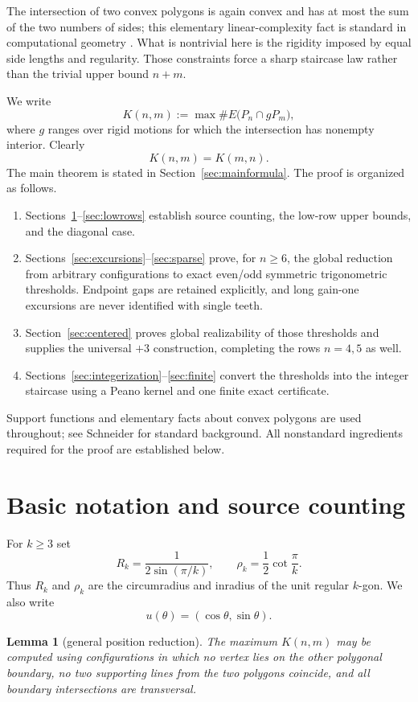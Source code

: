 \documentclass[11pt]{article}
\newtheorem{lemma}[theorem]{Lemma}
\theoremstyle{remark}
\begin{document}
The intersection of two convex polygons is again convex and has at most the sum of the two numbers of sides; this elementary linear-complexity fact is standard in computational geometry \cite[Sec.~7.6]{ORourke}. What is nontrivial here is the rigidity imposed by equal side lengths and regularity. Those constraints force a sharp staircase law rather than the trivial upper bound $n+m$.

We write
\[
K(n,m):=\max \#E\bigl(P_n\cap gP_m\bigr),
\]
where $g$ ranges over rigid motions for which the intersection has nonempty interior. Clearly
\[
K(n,m)=K(m,n).
\]
The main theorem is stated in Section~\ref{sec:mainformula}. The proof is organized as follows.

\begin{enumerate}[label=(\roman*)]
\item Sections~\ref{sec:basic}--\ref{sec:lowrows} establish source counting, the low-row upper bounds, and the diagonal case.
\item Sections~\ref{sec:excursions}--\ref{sec:sparse} prove, for $n\ge6$, the global reduction from arbitrary configurations to exact even/odd symmetric trigonometric thresholds. Endpoint gaps are retained explicitly, and long gain-one excursions are never identified with single teeth.
\item Section~\ref{sec:centered} proves global realizability of those thresholds and supplies the universal $+3$ construction, completing the rows $n=4,5$ as well.
\item Sections~\ref{sec:integerization}--\ref{sec:finite} convert the thresholds into the integer staircase using a Peano kernel and one finite exact certificate.
\end{enumerate}

Support functions and elementary facts about convex polygons are used throughout; see Schneider \cite{Schneider} for standard background. All nonstandard ingredients required for the proof are established below.

\section{Basic notation and source counting}\label{sec:basic}

For $k\ge3$ set
\[
 R_k=\frac1{2\sin(\pi/k)},\qquad
 \rho_k=\frac12\cot\frac{\pi}{k}.
\]
Thus $R_k$ and $\rho_k$ are the circumradius and inradius of the unit regular $k$-gon. We also write
\[
 u(\theta)=(\cos\theta,\sin\theta).
\]

\begin{lemma}[general position reduction]\label{lem:generalposition}
The maximum $K(n,m)$ may be computed using configurations in which no vertex lies on the other polygonal boundary, no two supporting lines from the two polygons coincide, and all boundary intersections are transversal.
\end{lemma}
\end{document}

